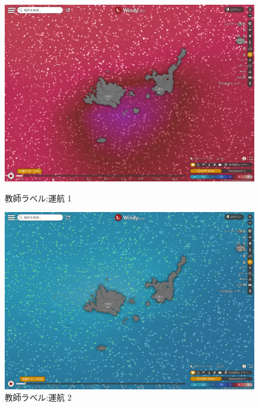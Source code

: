 \begin{figure}[htbp]
 \begin{minipage}{0.5\hsize}
  \begin{center}
   \includegraphics[keepaspectratio, scale=0.17]{fig/chapter4/wave_hateruma_2/unkou_aka.png}
  \end{center}
  \caption{教師ラベル:運航 1}
  \label{aka}
 \end{minipage}
 \begin{minipage}{0.5\hsize}
  \begin{center}
  \includegraphics[keepaspectratio, scale=0.17]{fig/chapter4/wave_hateruma_2/unkou_ao.png}
  \end{center}
   \caption{教師ラベル:運航 2}
  \label{unkou_ao}
 \end{minipage}
\end{figure}

